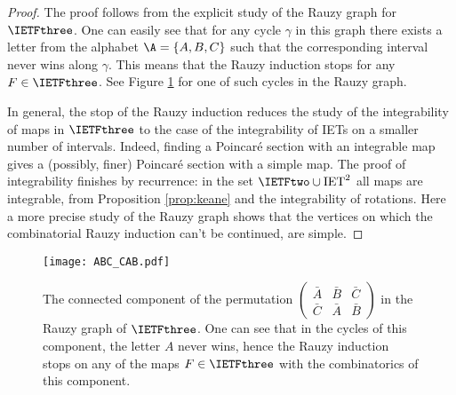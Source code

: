 \documentclass[12pt]{article}
\theoremstyle{definition}
\begin{document}
\begin{proof}
The proof follows from the explicit study of the Rauzy graph for $\IETFthree$. One can easily see that for any cycle $\gamma$ in this graph there exists a letter from the alphabet $\A=\{A,B,C\}$  such that the corresponding interval never wins along $\gamma$. This means that the Rauzy induction stops for any $F \in \IETFthree$. See Figure \ref{fig:little_component} for one of such cycles in the Rauzy graph. 

In general, the stop of the Rauzy induction reduces the study of the integrability of maps in $\IETFthree$  to the case of the integrability of IETs on a smaller number of intervals. Indeed, finding a Poincaré section with an integrable map gives a (possibly, finer) Poincaré section with a simple map. The proof of integrability finishes by recurrence: in the set $\IETFtwo \cup \mathrm{IET}^2$ all maps are integrable, from Proposition \ref{prop:keane} and the integrability of rotations. Here a more precise study of the Rauzy graph shows that the vertices on which the combinatorial Rauzy induction can't be continued, are simple.

%
%
\end{proof}



\begin{figure}
\centering
\texttt{[image: ABC\_CAB.pdf]}
\caption[]{
The connected component of the permutation $\begin{pmatrix}
\bar{A}&\bar{B}&\bar{C}\\
\bar{C}&\bar{A}&\bar{B}
\end{pmatrix}$ in the Rauzy graph of $\IETFthree$. One can see that in the cycles of this component, the letter $A$ never wins, hence the Rauzy induction stops on any of the maps $F\in \IETFthree$ with the combinatorics of this component.}
\label{fig:little_component}
\end{figure}
\end{document}
